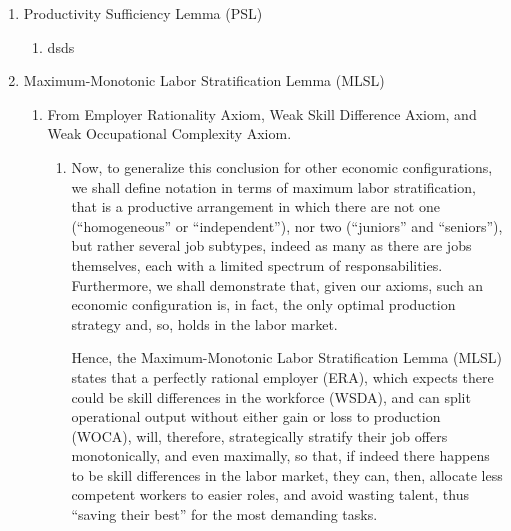 \documentclass[hidelinks, nonatbib]{elsarticle}
\begin{document}
\begin{enumerate}
    \item Productivity Sufficiency Lemma (PSL)
    \begin{enumerate}
        \item dsds
    \end{enumerate}

    \item Maximum-Monotonic Labor Stratification Lemma (MLSL)
    \begin{enumerate}
        \item From Employer Rationality Axiom, Weak Skill Difference Axiom, and Weak Occupational Complexity Axiom.
        \begin{enumerate}
            \item Now, to generalize this conclusion for other economic configurations, we shall define notation in terms of maximum labor stratification, that is a productive arrangement in which there are not one (``homogeneous'' or ``independent''), nor two (``juniors'' and ``seniors''), but rather several job subtypes, indeed as many as there are jobs themselves, each with a limited spectrum of responsabilities. Furthermore, we shall demonstrate that, given our axioms, such an economic configuration is, in fact, the only optimal production strategy and, so, holds in the labor market.
            
            Hence, the Maximum-Monotonic Labor Stratification Lemma (MLSL) states that a perfectly rational employer (ERA), which expects there could be skill differences in the workforce (WSDA), and can split operational output without either gain or loss to production (WOCA), will, therefore, strategically stratify their job offers monotonically, and even maximally, so that, if indeed there happens to be skill differences in the labor market, they can, then, allocate less competent workers to easier roles, and avoid wasting talent, thus ``saving their best'' for the most demanding tasks.
            

\end{enumerate}
\end{enumerate}
\end{enumerate}
\end{document}
